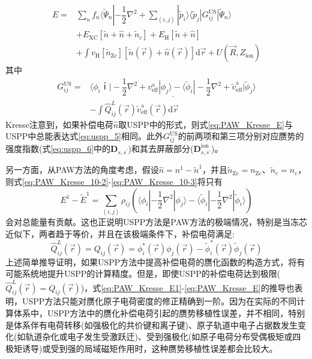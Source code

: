 \begin{equation}
	\begin{aligned}
		E=&\sum_nf_n\langle\tilde\Psi_n|-\dfrac12\nabla^2+\sum_{(i,j)}|\tilde p_i\rangle\langle\tilde p_j|G_{ij}^{\mathrm{US}}|\tilde\Psi_n\rangle\\
		&+E_{\mathrm{XC}}[\tilde n+\hat n+\tilde n_c]+E_{\mathrm{H}}[\tilde n+\hat n]\\
		&+\int v_{\mathrm{H}}[\tilde n_{\mathrm{Z}c}][\tilde n(\vec r)+\hat n(\vec r)]\mathrm{d}\vec r+U(\vec R,Z_{\mathrm{ion}})
	\end{aligned}
	\label{eq:PAW_Kresse_E}
\end{equation}
其中
\begin{displaymath}
	\begin{aligned}
		G_{ij}^{\mathrm{US}}=&\underline{\langle\phi_iｉ\bigg|-\dfrac12\nabla^2+v_{\mathrm{eff}}^{\mathrm{a}}|\phi_j\rangle-\langle\tilde\phi_i|-\dfrac12\nabla^2+\tilde v_{\mathrm{eff}}^{\mathrm{a}}\bigg|\tilde\phi_j\rangle}\\
&-\int\hat Q_{ij}^L(\vec r)\tilde v_{\mathrm{eff}}^{\mathrm a}(\vec r)\mathrm{d}\vec r
	\end{aligned}
\end{displaymath}
\textrm{Kresse}注意到，如果补偿电荷$\hat n$取\textrm{USPP}中的形式，则式\eqref{eq:PAW_Kresse_E}与\textrm{USPP}中总能表达式\eqref{eq:uspp_5}相同。此外$G_{ij}^{\mathrm{US}}$的前两项和第三项分别对应赝势的强度指数(式\eqref{eq:uspp_6}中的$\mathbf{D}_{s,s^{\prime}}$)和其去屏蔽部分($\mathbf{D}_{s,s^{\prime}}^{\mathrm{ion}}$)。

另一方面，从\textrm{PAW}方法的角度考虑，假设$\hat n=n^1-\tilde n^1$，并且$\tilde n_{\mathrm{Z}c}=n_{\mathrm{Z}c}$、$\tilde n_c=n_c$，则式\eqref{eq:PAW_Kresse_10-2}-\eqref{eq:PAW_Kresse_10-3}将只有
\begin{displaymath}
	E^1-\tilde E^1=\sum_{(i,j)}\rho_{ij}(\langle\phi_i|-\dfrac12\nabla^2|\phi_j\rangle-\langle\tilde\phi_i|-\dfrac12\nabla^2|\tilde\phi_i\rangle)
\end{displaymath}
会对总能量有贡献。这也正说明\textrm{USPP}方法是\textrm{PAW}方法的极端情况，特别是当冻芯近似下，两者趋于等价，并且在该极端条件下，补偿电荷满足:~
\begin{displaymath}
	\hat Q_{ij}^L(\vec r)=Q_{ij}(\vec r)=\phi_i^{\ast}(\vec r)\phi_j(\vec r)-\tilde\phi_i^{\ast}(\vec r)\tilde\phi_j(\vec r)
\end{displaymath}
上述简单推导证明，如果\textrm{USPP}方法中提高补偿电荷的赝化函数的构造方式，将有可能系统地提升\textrm{USPP}的计算精度。但是，即使\textrm{USPP}的补偿电荷达到极限($\hat Q_{ij}^L(\vec r)=Q_{ij}(\vec r)$)，式\eqref{eq:PAW_Kresse_E1}-\eqref{eq:PAW_Kresse_E}的推导也表明，\textrm{USPP}方法只能对赝化原子电荷密度的修正精确到一阶。因为在实际的不同计算体系中，\textrm{USPP}方法中的赝化补偿电荷引起的赝势移植性误差，并不相同，特别是体系伴有电荷转移(如强极化的共价键和离子键)、原子轨道中电子占据数发生变化(如轨道杂化或电子发生受激跃迁)、受到强极化(如原子电荷分布受偶极矩或四极矩诱导)或受到强的局域磁矩作用时，这种赝势移植性误差都会比较大。

